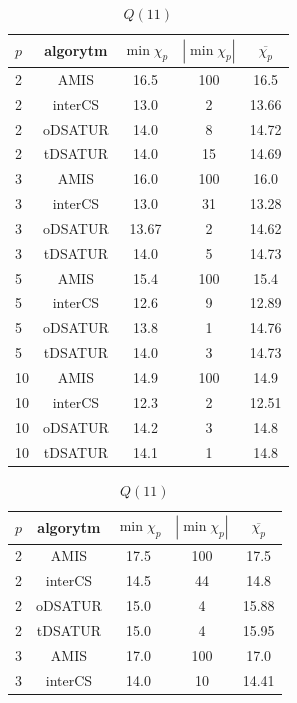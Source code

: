 \documentclass[10pt,a4paper]{article}
\begin{document}
	\begin{table}[H]
		\begin{minipage}{.5\linewidth}
			\centering
			\begin{tabular}{|l|c|c|c|c|}
				\hline
				\textbf{$p$} & \textbf{algorytm} & \textbf{$\min \chi_{p}$} & \textbf{$|\min \chi_{p}|$} & \textbf{$\overline{\chi_{p}}$} \\
				\hline
				2 & AMIS & 16.5 & 100 & 16.5 \\
				2 & interCS & 13.0 & 2 & 13.66 \\
				2 & oDSATUR & 14.0 & 8 & 14.72 \\
				2 & tDSATUR & 14.0 & 15 & 14.69 \\
				\hline
				3 & AMIS & 16.0 & 100 & 16.0 \\
				3 & interCS & 13.0 & 31 & 13.28 \\
				3 & oDSATUR & 13.67 & 2 & 14.62 \\
				3 & tDSATUR & 14.0 & 5 & 14.73 \\
				\hline
				5 & AMIS & 15.4 & 100 & 15.4 \\
				5 & interCS & 12.6 & 9 & 12.89 \\
				5 & oDSATUR & 13.8 & 1 & 14.76 \\
				5 & tDSATUR & 14.0 & 3 & 14.73 \\
				\hline
				10 & AMIS & 14.9 & 100 & 14.9 \\
				10 & interCS & 12.3 & 2 & 12.51 \\
				10 & oDSATUR & 14.2 & 3 & 14.8 \\
				10 & tDSATUR & 14.1 & 1 & 14.8 \\
				\hline
			\end{tabular}
			\caption{$Q(11)$}
		\end{minipage}
		\begin{minipage}{.5\linewidth}
			\centering
			\begin{tabular}{|l|c|c|c|c|}
				\hline
				\textbf{$p$} & \textbf{algorytm} & \textbf{$\min \chi_{p}$} & \textbf{$|\min \chi_{p}|$} & \textbf{$\overline{\chi_{p}}$} \\
				\hline
				2 & AMIS & 17.5 & 100 & 17.5 \\
				2 & interCS & 14.5 & 44 & 14.8 \\
				2 & oDSATUR & 15.0 & 4 & 15.88 \\
				2 & tDSATUR & 15.0 & 4 & 15.95 \\
				\hline
				3 & AMIS & 17.0 & 100 & 17.0 \\
				3 & interCS & 14.0 & 10 & 14.41 \\

\end{tabular}
\end{minipage}
\end{table}
\end{document}
